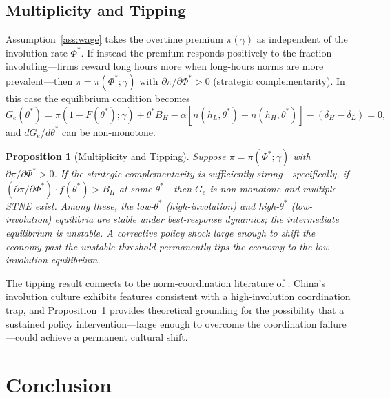 \documentclass[12pt]{article}
\theoremstyle{plain}
\newtheorem{proposition}{Proposition}
\theoremstyle{definition}
\theoremstyle{remark}
\newcommand{\tstar}{\theta^{*}}
\newcommand{\hH}{h_{H}}
\newcommand{\hL}{h_{L}}
\newcommand{\Phistar}{\Phi^{*}}
\begin{document}
\subsection{Multiplicity and Tipping}
\label{sec:extension}

Assumption~\ref{ass:wage} takes the overtime premium $\pi(\gamma)$ as independent of
the involution rate $\Phistar$.  If instead the premium responds positively to the
fraction involuting---firms reward long hours more when long-hours norms are more
prevalent---then $\pi = \pi(\Phistar; \gamma)$ with $\partial\pi/\partial\Phistar > 0$
(strategic complementarity).  In this case the equilibrium condition becomes
\begin{equation}
  G_{e}(\tstar) = \pi(1-F(\tstar);\gamma) + \tstar B_{H}
    - \alpha[n(\hL,\tstar) - n(\hH,\tstar)] - (\delta_H - \delta_L) = 0,
  \label{eq:Ge}
\end{equation}
and $dG_{e}/d\tstar$ can be non-monotone.

\begin{proposition}[Multiplicity and Tipping]
\label{prop:multi}
Suppose $\pi = \pi(\Phistar;\gamma)$ with $\partial\pi/\partial\Phistar > 0$.
If the strategic complementarity is sufficiently strong---specifically, if
$(\partial\pi/\partial\Phistar)\cdot f(\tstar) > B_{H}$ at some $\tstar$---then
$G_{e}$ is non-monotone and multiple STNE exist.  Among these, the low-$\tstar$
(high-involution) and high-$\tstar$ (low-involution) equilibria are stable under
best-response dynamics; the intermediate equilibrium is unstable.  A corrective
policy shock large enough to shift the economy past the unstable threshold permanently
tips the economy to the low-involution equilibrium.
\end{proposition}

The tipping result connects to the norm-coordination literature of \citet{Akerlof1976}:
China's involution culture exhibits features consistent with a high-involution
coordination trap, and Proposition~\ref{prop:multi} provides theoretical grounding
for the possibility that a sustained policy intervention---large enough to overcome
the coordination failure---could achieve a permanent cultural shift.

\section{Conclusion}
\label{sec:conclusion}
\end{document}

